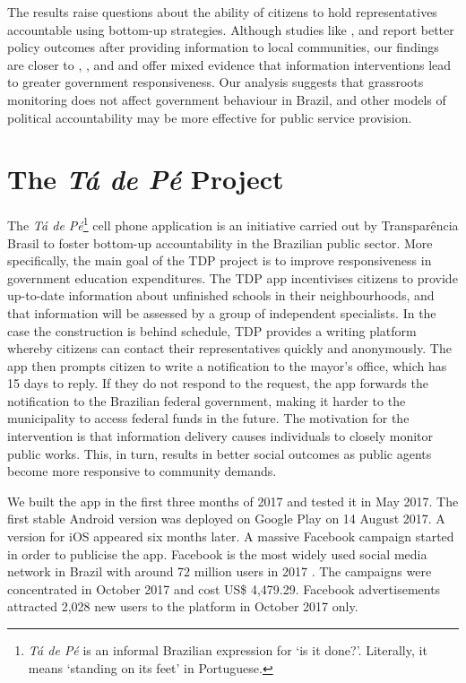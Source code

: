 \documentclass[12pt,a4paper,]{article}
\begin{document}
The results raise questions about the ability of citizens to hold
representatives accountable using bottom-up strategies. Although studies
like \citet{bjorkman2009power}, \citet{fiala2017social} and
\citet{reinikka2005fighting} report better policy outcomes after
providing information to local communities, our findings are closer to
\citet{banerjee2010pitfalls}, \citet{keefer2014mass},
\citet{olken2007monitoring} and \citet{raffler2018weakness} and offer
mixed evidence that information interventions lead to greater government
responsiveness. Our analysis suggests that grassroots monitoring does
not affect government behaviour in Brazil, and other models of political
accountability may be more effective for public service provision.

\hypertarget{the-ta-de-pe-project}{%
\section{\texorpdfstring{The \emph{Tá de Pé}
Project}{The Tá de Pé Project}}\label{the-ta-de-pe-project}}

\label{sec:tdp}

The \emph{Tá de Pé}\footnote{\emph{Tá de Pé} is an informal Brazilian
  expression for `is it done?'. Literally, it means `standing on its
  feet' in Portuguese.} cell phone application is an initiative carried
out by Transparência Brasil to foster bottom-up accountability in the
Brazilian public sector. More specifically, the main goal of the TDP
project is to improve responsiveness in government education
expenditures. The TDP app incentivises citizens to provide up-to-date
information about unfinished schools in their neighbourhoods, and that
information will be assessed by a group of independent specialists. In
the case the construction is behind schedule, TDP provides a writing
platform whereby citizens can contact their representatives quickly and
anonymously. The app then prompts citizen to write a notification to the
mayor's office, which has 15 days to reply. If they do not respond to
the request, the app forwards the notification to the Brazilian federal
government, making it harder to the municipality to access federal funds
in the future. The motivation for the intervention is that information
delivery causes individuals to closely monitor public works. This, in
turn, results in better social outcomes as public agents become more
responsive to community demands.

We built the app in the first three months of 2017 and tested it in May
2017. The first stable Android version was deployed on Google Play on 14
August 2017. A version for iOS appeared six months later. A massive
Facebook campaign started in order to publicise the app. Facebook is the
most widely used social media network in Brazil with around 72 million
users in 2017 \citep{statista2019facebook}. The campaigns were
concentrated in October 2017 and cost US\$ 4,479.29. Facebook
advertisements attracted 2,028 new users to the platform in October 2017
only.
\end{document}

